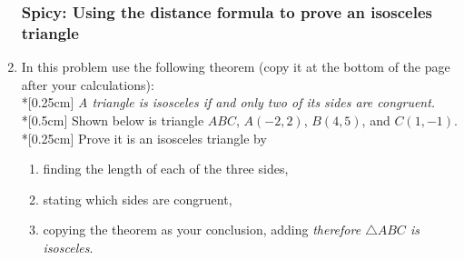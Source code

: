 \documentclass[12pt, twoside]{article}
\begin{document}
\begin{enumerate}
\newpage
  \subsubsection*{Spicy: Using the distance formula to prove an isosceles triangle}
\item In this problem use the following theorem (copy it at the bottom of the page after your calculations): \\*[0.25cm]
    \emph{A triangle is isosceles if and only two of its sides are congruent.}\\*[0.5cm]
    Shown below is triangle $ABC$, $A(-2,2)$, $B(4,5)$, and $C(1,-1)$. \\*[0.25cm]
    Prove it is an isosceles triangle by
    \begin{enumerate}
      \item finding the length of each of the three sides,
      \item stating which sides are congruent,
      \item copying the theorem as your conclusion, adding \emph{therefore $\triangle ABC$ is isosceles}.
    \end{enumerate}
    \begin{flushright} %
    \end{flushright}


\end{enumerate}
\end{document}
